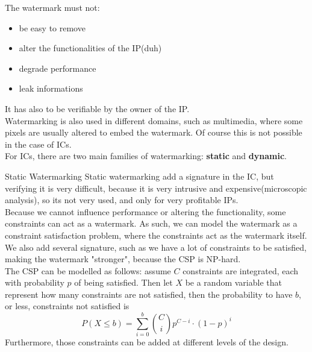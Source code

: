 The watermark must not:
\begin{itemize}
  \item be easy to remove
  \item alter the functionalities of the IP(duh)
  \item degrade performance
  \item leak informations
\end{itemize}
It has also to be verifiable by the owner of the IP.\\
Watermarking is also used in different domains, such as multimedia, where some pixels are usually altered 
to embed the watermark. Of course this is not possible in the case of ICs.\\
For ICs, there are two main families of watermarking: \textbf{static} and \textbf{dynamic}.
\begin{section}{Static Watermarking}
  Static watermarking add a signature in the IC, but verifying it is very difficult, because it 
  is very intrusive and expensive(microscopic analysis), so its not very used, and only for very 
  profitable IPs.\\
  Because we cannot influence performance or altering the functionality, some constraints can act 
  as a watermark. As such, we can model the watermark as a constraint satisfaction problem, where the 
  constraints act as the watermark itself.
  We also add several signature, such as we have a lot of constraints to be satisfied, making the 
  watermark "stronger", because the CSP is NP-hard.\\
  The CSP can be modelled as follows: assume $C$ constraints are integrated, each with probability 
  $p$ of being satisfied.
  Then let $X$ be a random variable that represent how many constraints are not satisfied, then 
  the probability to have $b$, or less, constraints not satisfied is
  \begin{equation}
    P(X\le b )=\sum^b_{i=0}\binom{C}{i}p^{C-i}\cdot(1-p)^i
  \end{equation}
  Furthermore, those constraints can be added at different levels of the design.


\end{section}
